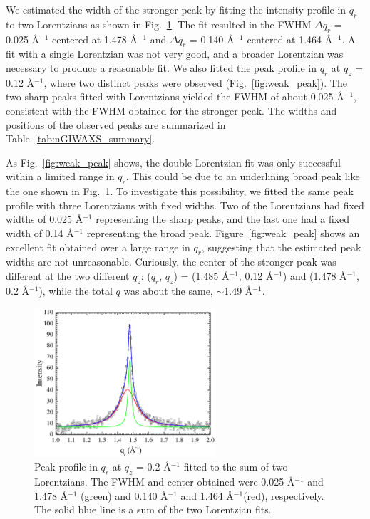 We estimated the width of the stronger peak by fitting 
the intensity profile in $q_r$ to two Lorentzians as shown in 
Fig.~\ref{fig:strong_peak}. The fit resulted in the FWHM $\Delta q_r$
= 0.025 \AA$^{-1}$ centered at 1.478 \AA$^{-1}$ and 
$\Delta q_r$ = 0.140 \AA$^{-1}$ centered at 1.464 \AA$^{-1}$.
A fit with a single Lorentzian was not very good, and 
a broader Lorentzian was necessary to produce a reasonable fit. 
We also fitted the peak profile in $q_r$ at $q_z$ = 0.12 \AA$^{-1}$,
where two distinct peaks were observed (Fig.~\ref{fig:weak_peak}).
The two sharp peaks fitted with Lorentzians yielded the FWHM of about 
0.025 \AA$^{-1}$, consistent with the FWHM obtained for the stronger 
peak. The widths and positions of the observed peaks are summarized
in Table~\ref{tab:nGIWAXS_summary}.

As Fig.~\ref{fig:weak_peak}
shows, the double Lorentzian fit was only successful within a limited range
in $q_r$. This could be due to an underlining broad peak like the one
shown in Fig.~\ref{fig:strong_peak}. To investigate this possibility,
we fitted the same peak profile with three Lorentzians with fixed widths.
Two of the Lorentzians had fixed widths of 0.025 \AA$^{-1}$ representing 
the sharp peaks, and the last one had a fixed width of 0.14 \AA$^{-1}$
representing the broad peak. Figure~\ref{fig:weak_peak} shows an excellent
fit obtained over a large range in $q_r$, suggesting that the estimated
peak widths are not unreasonable.
Curiously, the center of the stronger peak was different at the two 
different $q_z$: ($q_r$, $q_z$) = (1.485 \AA$^{-1}$, 0.12 \AA$^{-1}$)
and (1.478 \AA$^{-1}$, 0.2 \AA$^{-1}$), while the total $q$ was about
the same, $\sim$1.49 \AA$^{-1}$.

\begin{figure}[htbp]
  \centering
  \includegraphics[width=0.6\textwidth]{figures/ripple/nGIWAXS/strong_peak_Lorentz}
  \caption[Peak profile in $q_r$ at $q_z$ = 0.2 \AA$^{-1}$ 
  fitted to the sum of two Lorentzians]
  {Peak profile in $q_r$ at $q_z$ = 0.2 \AA$^{-1}$ 
  fitted to the sum of two Lorentzians. The FWHM and center obtained 
  were 0.025 \AA$^{-1}$ and 1.478 \AA$^{-1}$ (green) and 0.140 \AA$^{-1}$ 
  and 1.464 \AA$^{-1}$(red), respectively. The solid blue line is a sum
  of the two Lorentzian fits.}
  \label{fig:strong_peak}
\end{figure}


